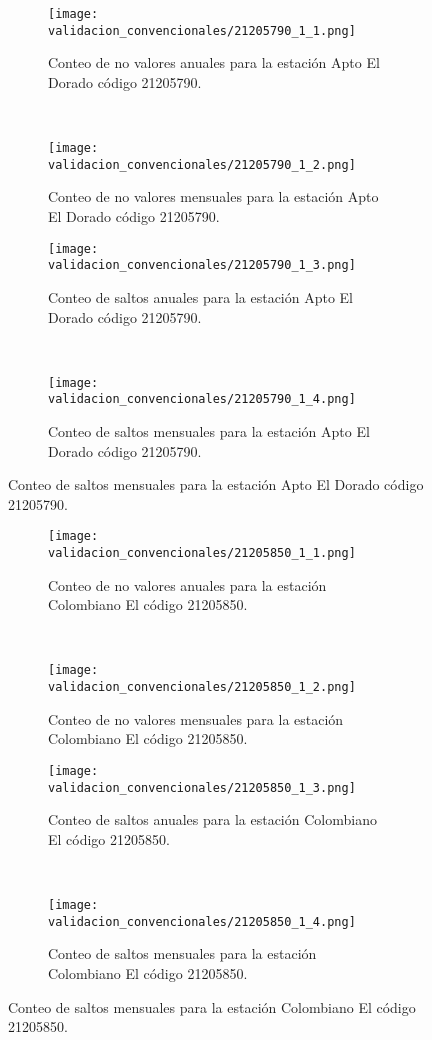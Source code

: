 \begin{figure}[H]
	\centering
	\begin{subfigure}[normla]{0.4\textwidth}
	\texttt{[image: validacion\_convencionales/21205790\_1\_1.png]}
		\caption{Conteo de no valores anuales para la estación Apto El Dorado código 21205790.}
		\label{subfig:a1}
		\end{subfigure}
		~
    \begin{subfigure}[normla]{0.4\textwidth}
	\texttt{[image: validacion\_convencionales/21205790\_1\_2.png]}
		\caption{Conteo de no valores mensuales para la estación Apto El Dorado código 21205790.}
		\label{subfig:a2}
		\end{subfigure}
		
    \begin{subfigure}[normla]{0.4\textwidth}
	\texttt{[image: validacion\_convencionales/21205790\_1\_3.png]}
		\caption{Conteo de saltos anuales para la estación Apto El Dorado código 21205790.}
		\label{subfig:a1}
		\end{subfigure}
		~
    \begin{subfigure}[normla]{0.4\textwidth}
	\texttt{[image: validacion\_convencionales/21205790\_1\_4.png]}
		\caption{Conteo de saltos mensuales para la estación Apto El Dorado código 21205790.}
		\label{subfig:a2}
		\end{subfigure}

	
\end{figure}
           
\begin{figure}[H]\ContinuedFloat
\centering
	\begin{subfigure}[normla]{0.4\textwidth}
	\texttt{[image: validacion\_convencionales/21205850\_1\_1.png]}
		\caption{Conteo de no valores anuales para la estación Colombiano El código 21205850.}
		\label{subfig:a1}
		\end{subfigure}
		~
    \begin{subfigure}[normla]{0.4\textwidth}
	\texttt{[image: validacion\_convencionales/21205850\_1\_2.png]}
		\caption{Conteo de no valores mensuales para la estación Colombiano El código 21205850.}
		\label{subfig:a2}
		\end{subfigure}
		
    \begin{subfigure}[normla]{0.4\textwidth}
	\texttt{[image: validacion\_convencionales/21205850\_1\_3.png]}
		\caption{Conteo de saltos anuales para la estación Colombiano El código 21205850.}
		\label{subfig:a1}
		\end{subfigure}
		~
    \begin{subfigure}[normla]{0.4\textwidth}
	\texttt{[image: validacion\_convencionales/21205850\_1\_4.png]}
		\caption{Conteo de saltos mensuales para la estación Colombiano El código 21205850.}
		\label{subfig:a2}
		\end{subfigure}

	
\end{figure}
           
